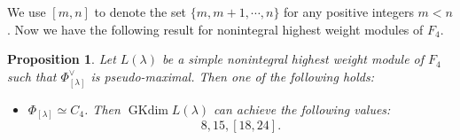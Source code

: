 \documentclass[reqno,12pt]{amsart}
\numberwithin{equation}{section}
\theoremstyle{plain}
\newtheorem{Prop}[Thm]{Proposition}
\theoremstyle{definition}
\newcommand{\lam}{\lambda}
\newcommand{\Ann}{\mathrm{Ann}}
\newcommand{\gkd}{\operatorname{GKdim}}
\begin{document}
We use $[m,n]$ to denote the set $\{m, m+1,\cdots,n\}$ for any positive integers $m<n$. Now we have the following result for nonintegral highest weight modules of $F_4$.





\begin{Prop}\label{f4-nonint}
Let $L(\lam)$ be a simple nonintegral highest weight module of $F_4$  such that $\Phi_{[\lam]}^\vee$ is pseudo-maximal.
Then one of the following holds:
    \begin{itemize}
	\item[(1)]  $\Phi_{[\lam]}\simeq C_4$. Then 
 $ \gkd L(\lam) $ can achieve the following values:
$$8,15,[18,24].$$





   
    


\end{itemize}
\end{Prop}
\end{document}

